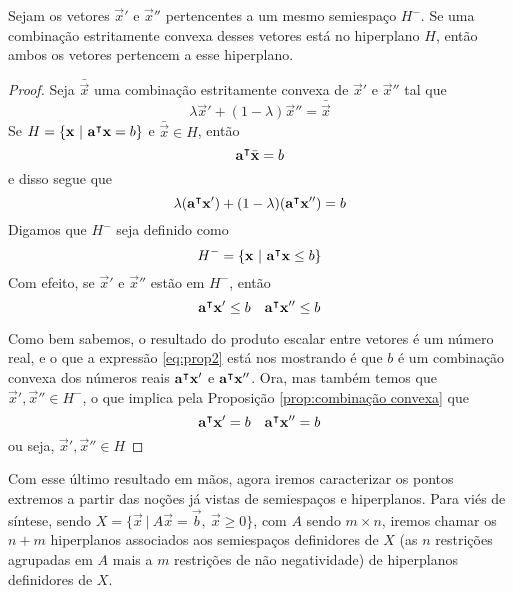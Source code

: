 \begin{prop:hiperplano e ponto extremo}
	\label{prop:hiperplano e ponto extremo}
	Sejam os vetores $\vec{x}'$ e $\vec{x}''$ pertencentes a um mesmo semiespaço $H^-$. Se uma combinação estritamente convexa desses vetores está no hiperplano $H$, então ambos os vetores pertencem a esse hiperplano.
	
	\begin{proof}
		Seja $\bar{\vec{x}}$ uma combinação estritamente convexa de $\vec{x}'$ e $\vec{x}''$ tal que 
		\[\lambda \vec{x}' + (1 - \lambda) \vec{x}'' = 		\bar{\vec{x}}\]
		Se $H = \{\mathbf{x}\ |\ \mathbf{a}^\intercal\mathbf{x} = b\}$ e $\bar{\vec{x}} \in H$, então
		\[\mathbf{a}^\intercal\bar{\mathbf{x}} = b\]
		e disso segue que
		\begin{equation}
			\label{eq:prop2}
			\lambda (\mathbf{a}^\intercal\mathbf{x}') + (1 - \lambda) 	(\mathbf{a}^\intercal\mathbf{x}'') = b
		\end{equation}
		Digamos que $H^-$ seja definido como
		\[H^- = \{\vec{x}\ |\ \transp{a}\vec{x} \leq b\}\]
		Com efeito, se $\vec{x}'$ e $\vec{x}''$ estão em $H^-$, então
		\[\mathbf{a}^\intercal\mathbf{x}' \leq b \quad \mathbf{a}^\intercal\mathbf{x}'' \leq b\]
	
		
		Como bem sabemos, o resultado do produto escalar entre vetores é um número real, e o que a expressão \ref{eq:prop2} está nos mostrando é que $b$ é um combinação convexa dos números reais $\mathbf{a}^\intercal\mathbf{x}'$ e $\mathbf{a}^\intercal\mathbf{x}''$. Ora, mas também temos que $\vec{x}', \vec{x}'' \in H^-$, o que implica pela Proposição \ref*{prop:combinação convexa} que
		\[\mathbf{a}^\intercal\mathbf{x}' = b \quad \mathbf{a}^\intercal\mathbf{x}'' = b\]ou seja, $\vec{x}', \vec{x}'' \in H$
	\end{proof} 
\end{prop:hiperplano e ponto extremo}

Com esse último resultado em mãos, agora iremos caracterizar os pontos extremos a partir das noções já vistas de semiespaços e hiperplanos. Para viés de síntese, sendo $X = \{\vec{x}\ |\ A\vec{x} = \vec{b},\ \vec{x} \geq 0\}$, com $A$ sendo $m \times n$, iremos chamar os $n + m$ hiperplanos associados aos semiespaços definidores de $X$ (as $n$ restrições agrupadas em $A$ mais a $m$ restrições de não negatividade) de hiperplanos definidores de $X$.  

